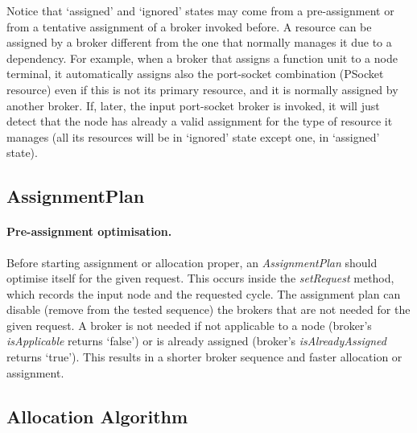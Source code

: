\documentclass[a4paper,twoside]{tce}
\begin{document}
Notice that `assigned' and `ignored' states may come from a pre-assignment
or from a tentative assignment of a broker invoked before. A resource can be
assigned by a broker different from the one that normally manages it due to
a dependency. For example, when a broker that assigns a function unit to a
node terminal, it automatically assigns also the port-socket combination
(PSocket resource) even if this is not its primary resource, and it is
normally assigned by another broker. If, later, the input port-socket broker
is invoked, it will just detect that the node has already a valid assignment
for the type of resource it manages (all its resources will be in `ignored'
state except one, in `assigned' state).

\subsection{AssignmentPlan}
\label{ssec:AssignmentPlan-imp}

\paragraph{Pre-assignment optimisation.}

Before starting assignment or allocation proper, an \emph{AssignmentPlan}
should optimise itself for the given request. This occurs inside the
\emph{setRequest} method, which records the input node and the requested
cycle. The assignment plan can disable (remove from the tested sequence) the
brokers that are not needed for the given request. A broker is not needed if
not applicable to a node (broker's \emph{isApplicable} returns `false') or
is already assigned (broker's \emph{isAlreadyAssigned} returns `true').
%
This results in a shorter broker sequence and faster allocation or
assignment.

\subsection{Allocation Algorithm}
\label{ssec:allocation-algorithm}
\end{document}
